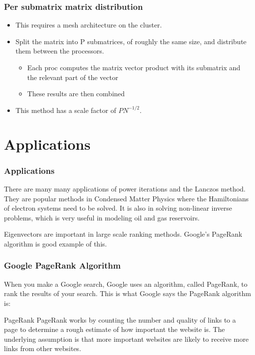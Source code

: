 \documentclass[pdf]{beamer}
\begin{document}
\begin{frame}
\frametitle{Per submatrix matrix distribution}
\begin{itemize}
\item This requires a mesh architecture on the cluster.
\item Split the matrix into P submatrices, of roughly the same size, and distribute them between the processors.
\begin{itemize}
\item Each proc computes the matrix vector product with its submatrix and the relevant part of the vector
\item These results are then combined
\end{itemize}
\item This method has a scale factor of $PN^{-1/2}$.
\end{itemize}
\end{frame}




\section{Applications}

\begin{frame}
\tableofcontents[currentsection]
\end{frame}


\begin{frame}
\frametitle{Applications}
There are many many applications of power iterations and the Lanczos method. They are popular methods in Condensed Matter Physics where the Hamiltonians of electron systems need to be solved. It is also in solving non-linear inverse problems, which is very useful in modeling oil and gas reservoirs.

Eigenvectors are important in large scale ranking methods. Google's PageRank algorithm is good example of this. 
\end{frame}


\begin{frame}
\frametitle{Google PageRank Algorithm}

When you make a Google search, Google uses an algorithm, called PageRank, to rank the results of your search. This is what Google says the PageRank algorithm is:

\begin{exampleblock}{PageRank}
PageRank works by counting the number and quality of links to a page to determine a rough estimate of how important the website is. The underlying assumption is that more important websites are likely to receive more links from other websites. 
\end{exampleblock}

\end{frame}
\end{document}
